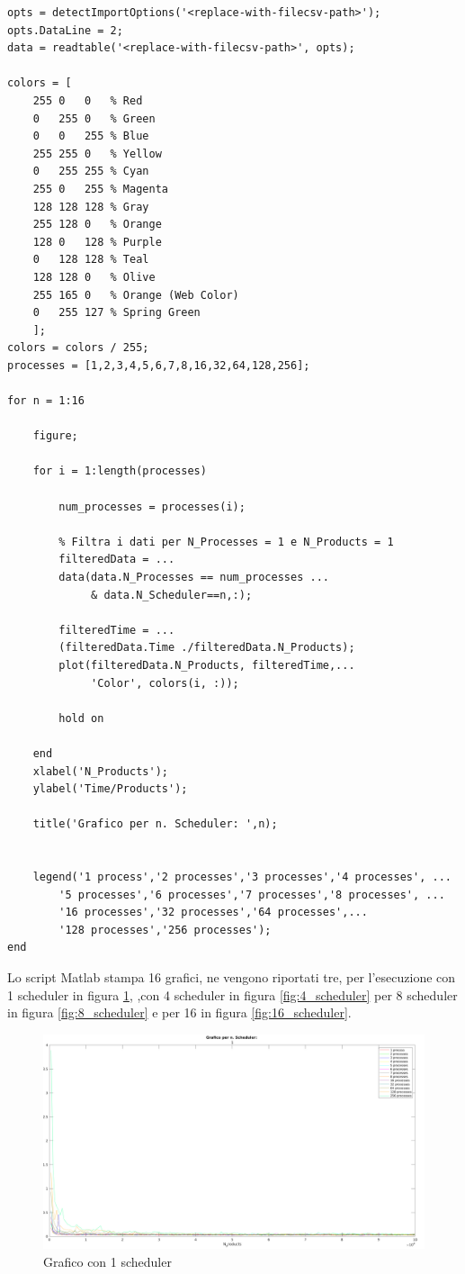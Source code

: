 \begin{lstlisting}[language=none,captionpos=b,
	caption={Codice Matlab per la stampa dei grafici},label={lst:analisi_matlab}]
opts = detectImportOptions('<replace-with-filecsv-path>');
opts.DataLine = 2;
data = readtable('<replace-with-filecsv-path>', opts);

colors = [
    255 0   0   % Red
    0   255 0   % Green
    0   0   255 % Blue
    255 255 0   % Yellow
    0   255 255 % Cyan
    255 0   255 % Magenta
    128 128 128 % Gray
    255 128 0   % Orange
    128 0   128 % Purple
    0   128 128 % Teal
    128 128 0   % Olive
    255 165 0   % Orange (Web Color)
    0   255 127 % Spring Green
    ];
colors = colors / 255;
processes = [1,2,3,4,5,6,7,8,16,32,64,128,256];

for n = 1:16

    figure;

    for i = 1:length(processes)

        num_processes = processes(i);

        % Filtra i dati per N_Processes = 1 e N_Products = 1
        filteredData = ... 
		data(data.N_Processes == num_processes ... 
		     & data.N_Scheduler==n,:);

        filteredTime = ... 
		(filteredData.Time ./filteredData.N_Products);
        plot(filteredData.N_Products, filteredTime,... 
		     'Color', colors(i, :));

        hold on

    end
    xlabel('N_Products');
    ylabel('Time/Products');

    title('Grafico per n. Scheduler: ',n);


    legend('1 process','2 processes','3 processes','4 processes', ...
        '5 processes','6 processes','7 processes','8 processes', ...
        '16 processes','32 processes','64 processes',... 
		'128 processes','256 processes');
end
\end{lstlisting}

Lo script Matlab stampa 16 grafici, ne vengono riportati
tre, per l'esecuzione con 1 scheduler in figura \ref{fig:1_scheduler},
,con 4 scheduler in figura \ref{fig:4_scheduler} per 8 scheduler in figura \ref{fig:8_scheduler}
e per 16 in figura \ref{fig:16_scheduler}.

\begin{figure}[!htp]
    \centering
    \includegraphics[keepaspectratio=true,scale=0.33]{images/matlab/1_scheduler.png}
	\caption{Grafico con 1 scheduler}
  	\label{fig:1_scheduler}
\end{figure}

